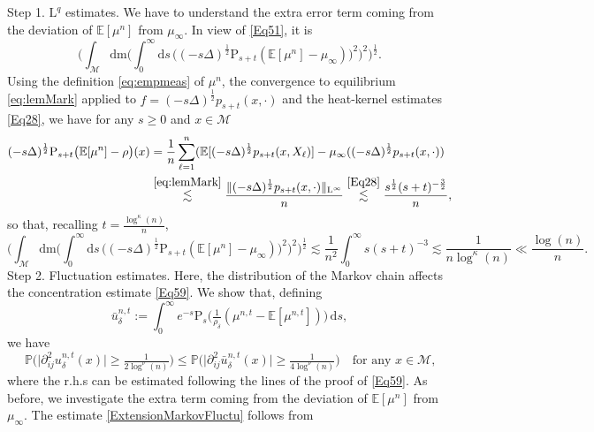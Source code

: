 \documentclass[11pt,a4paper,oneside]{amsart}
\numberwithin{equation}{section}
\newcommand{\dd}{\mathrm{d}}
\newcommand{\LL}{\mathrm{L}}
\newcommand{\m}{\mathrm{m}}
\begin{document}
{\sc Step 1. $\LL^q$ estimates. }We have to understand the extra error term coming from the deviation of $\mathbb{E}[\mu^n]$ from $\mu_\infty$. In view of \eqref{Eq51}, it is 
%
$$\bigg(\int_{\mathcal{M}}\dd\m\Big(\int_{0}^\infty \dd s\,\big((-s\Delta)^{\frac{1}{2}}\text{P}_{s+t}(\mathbb{E}[\mu^n]-\mu_\infty)\big)^2\Big)^2\bigg)^{\frac{1}{2}}.$$
%
Using the definition \eqref{eq:empmeas} of $\mu^n$, the convergence to equilibrium \eqref{eq:lemMark} applied to $f=(-s\Delta)^{\frac{1}{2}}p_{s+t}(x,\cdot)$ and the heat-kernel estimates \eqref{Eq28}, we have for any $s\geq 0$ and $x\in\mathcal{M}$
\begin{equation}\label{eq:estLqmark}
%
\begin{aligned}
(-s\Delta)^\frac12 \text{P}_{s+t}\big(\mathbb{E}[\mu^n] - \rho\big)(x)
& = \frac1n \sum_{\ell=1}^n  (\mathbb{E}[(-s\Delta)^\frac12 p_{s+t}(x,X_\ell)] - \mu_\infty((-s\Delta)^\frac12 p_{s+t}(x,\cdot))\\ & \stackrel{\eqref{eq:lemMark}}{\lesssim}  \frac{\|(-s \Delta)^\frac12 p_{s+t}(x,\cdot)\|_{\LL^\infty}}n\stackrel{\eqref{Eq28}}{\lesssim}\frac{s^\frac12(s+t)^{-\frac32}}n,
\end{aligned}
%
\end{equation}
%
so that, recalling $t=\frac{\log^{\kappa}(n)}{n}$,
%
$$\bigg(\int_{\mathcal{M}}\dd\m\Big(\int_{0}^\infty \dd s\,\big((-s\Delta)^{\frac{1}{2}}\text{P}_{s+t}(\mathbb{E}[\mu^n]-\mu_\infty)\big)^2\Big)^2\bigg)^{\frac{1}{2}}\lesssim \frac{1}{n^2}\int_0^\infty s(s+t)^{-3}\lesssim \frac{1}{n\log^{\kappa}(n)}\ll\frac{\log(n)}{n}.$$
%
{\sc Step 2. Fluctuation estimates. }Here, the distribution of the Markov chain affects the concentration estimate \eqref{Eq59}. We show that, defining 
%
\begin{equation}\label{ExtensionMarkovFluctu3}
%
\bar{u}^{n,t}_\delta:=\int_{0}^\infty e^{-s}\text{P}_s\Big(\tfrac{1}{\rho_\delta}(\mu^{n,t}-\mathbb{E}[\mu^{n,t}])\Big)\,\dd s,
%
\end{equation}
%
we have
%
\begin{equation}\label{ExtensionMarkovFluctu}
%
\mathbb{P}\Big(\vert\partial^2_{ij} u^{n,t}_\delta(x)\vert\geq \tfrac{1}{2\log^{\nu}(n)}\Big)\leq \mathbb{P}\Big(\vert\partial^2_{ij} \bar{u}^{n,t}_\delta(x)\vert\geq \tfrac{1}{4\log^{\nu}(n)}\Big)\quad\text{for any $x\in\mathcal{M}$,}
%
\end{equation}
%
where the r.h.s can be estimated following the lines of the proof of \eqref{Eq59}. As before, we investigate the extra term coming from the deviation of $\mathbb{E}[\mu^n]$ from $\mu_\infty$. The estimate \eqref{ExtensionMarkovFluctu} follows from 
\end{document}
